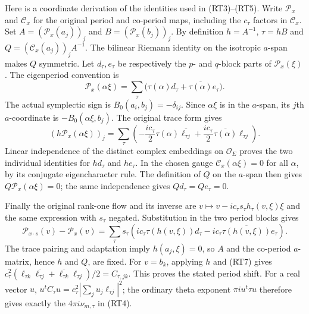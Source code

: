 Here is a coordinate derivation of the identities used in
\textup{(RT3)--(RT5)}.  Write $\mathcal P_x$ and $\mathcal C_x$ for
the original period and co-period maps, including the $c_\tau$ factors
in $\mathcal C_x$.  Set
$A=(\mathcal P_x(a_j))_j$ and $B=(\mathcal P_x(b_j))_j$.
By definition
$h=A^{-1}$, $\tau=hB$ and
$Q=(\mathcal C_x(a_j))_jA^{-1}$.
The bilinear Riemann identity on the isotropic $a$-span makes $Q$
symmetric.  Let $d_\tau,e_\tau$ be respectively the $p$- and
$q$-block parts of $\mathcal P_x(\xi)$.  The eigenperiod convention is
\[
 \mathcal P_x(\alpha\xi)
       =\sum_\tau\bigl(\tau(\alpha)d_\tau
                             +\overline{\tau(\alpha)}e_\tau\bigr).
\]
The actual symplectic sign is $B_0(a_i,b_j)=-\delta_{ij}$.
Since $\alpha\xi$ is in the $a$-span, its $j$th $a$-coordinate
is $-B_0(\alpha\xi,b_j)$.  The original trace form gives
\[
 (h\mathcal P_x(\alpha\xi))_j
   =\sum_\tau\left(
      -\frac{i c_\tau}{2}\tau(\alpha)\overline{\ell_{\tau j}}
      +\frac{i c_\tau}{2}\overline{\tau(\alpha)}\ell_{\tau j}
                \right).                              \tag{RT7}
\]
Linear independence of the distinct complex embeddings on
$\mathcal O_E$ proves the two individual identities for $hd_\tau$
and $he_\tau$.  In the chosen gauge
$\mathcal C_x(\alpha\xi)=0$ for all $\alpha$, by its conjugate
eigencharacter rule.  The definition of $Q$ on the $a$-span then gives
$Q\mathcal P_x(\alpha\xi)=0$; the same independence gives
$Qd_\tau=Qe_\tau=0$.

Finally the original rank-one flow and its inverse are
$v\mapsto v-i c_\tau s_\tau h_\tau(v,\xi)\xi$ and the same
expression with $s_\tau$ negated.  Substitution in the two period
blocks gives
\[
 \mathcal P_{x\cdot s}(v)-\mathcal P_x(v)
   =\sum_\tau s_\tau\left(
       i c_\tau\tau(h(v,\xi))d_\tau
       -i c_\tau\overline{\tau(h(v,\xi))}e_\tau\right).
\]
The trace pairing and adaptation imply $h(a_j,\xi)=0$, so $A$ and
the co-period $a$-matrix, hence $h$ and $Q$, are fixed.
For $v=b_k$, applying $h$ and \textup{(RT7)} gives
$c_\tau^2(\ell_{\tau k}\overline{\ell_{\tau j}}+
\overline{\ell_{\tau k}}\ell_{\tau j})/2=C_{\tau,jk}$.
This proves the stated period shift.  For a real vector $u$,
$u^tC_\tau u=c_\tau^2|\sum_j u_j\ell_{\tau j}|^2$;
the ordinary theta exponent $\pi i u^t\tau u$ therefore gives
exactly the $4\pi i\nu_{m,\tau}$ in \textup{(RT4)}.

